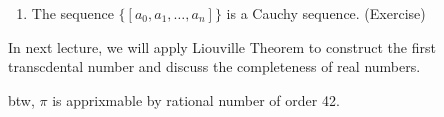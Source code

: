 \begin{enumerate}
\begin{proof}
\begin{align*}
&=\left|\frac{a_{n+1}'p_n + p_{n-1}}{a_{n+1}'q_n+q_{n-1}}-\frac{p_n}{q_n}\right|
=\left|
\frac{p_{n-1}q_n - p_nq_{n-1}}{q_n(a_{n+1}'q_n+q_{n-1})}\right|\\
&=\left|\frac{(-1)^{n}
p_1q_0-p_0q_1}{q_n(a_{n+1}'q_n+q_{n-1})}\right|
=\frac{1}{q_n(a_{n+1}'q_n+q_{n-1})}\\
&<\frac{1}{q_nq_{n+1}}
\end{align*}
\end{proof}
\begin{corollary}
Furthermore, for the convergent term $\frac{p_n}{q_n} (n\ge0)$ of $x$, we have
\[
\left|
x-\frac{p_n}{q_n}
\right|<\frac{1}{q_{n}^2}
\]
\end{corollary}
\item
The sequence $\{[a_0,a_1,\dots,a_n]\}$ is a Cauchy sequence. (Exercise)
\end{enumerate}

In next lecture, we will apply Liouville Theorem to construct the first transcdental number and discuss the completeness of real numbers. 

btw, $\pi$ is apprixmable by rational number of order 42.




